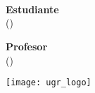 \begin{titlepage}
    \begin{center}
        \Large
        \hfill

        \mySubjectFull \\ \myCourseYear \\

        \vfill

        \begingroup
        \Large\bfseries\myTitle \\ \bigskip
        \endgroup

        \vfill

        \textbf{Estudiante} \\ \myName (\myEmail)

        \textbf{Profesor} \\ \myProfName (\myProfEmail)

        \vfill

        \texttt{[image: ugr\_logo]} \\ \medskip
        \myDate

    \end{center}
\end{titlepage}
